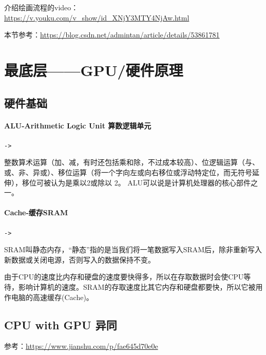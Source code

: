 \documentclass[UTF8,a4paper,12pt]{ctexbook}
\begin{document}
	介绍绘画流程的video：\url{https://v.youku.com/v_show/id_XNjY3MTY4NjAw.html}
	
	本节参考：\url{https://blog.csdn.net/admintan/article/details/53861781}
	\section{最底层——GPU/硬件原理}
		
		\subsection{硬件基础}
			\paragraph{ALU-Arithmetic Logic Unit 算数逻辑单元}\verb|->|
			
				整数算术运算（加、减，有时还包括乘和除，不过成本较高）、位逻辑运算（与、或、非、异或）、移位运算（将一个字向左或向右移位或浮动特定位，而无符号延伸），移位可被认为是乘以2或除以 2。 ALU可以说是计算机处理器的核心部件之一。

			\paragraph{Cache-缓存SRAM}\verb|->|
			
				SRAM叫静态内存，“静态”指的是当我们将一笔数据写入SRAM后，除非重新写入新数据或关闭电源，否则写入的数据保持不变。 
				
				由于CPU的速度比内存和硬盘的速度要快得多，所以在存取数据时会使CPU等待，影响计算机的速度。SRAM的存取速度比其它内存和硬盘都要快，所以它被用作电脑的高速缓存(Cache)。
		\subsection{CPU with GPU 异同}
		
			参考：\url{https://www.jianshu.com/p/fae645d70e0e}
		
\end{document}
